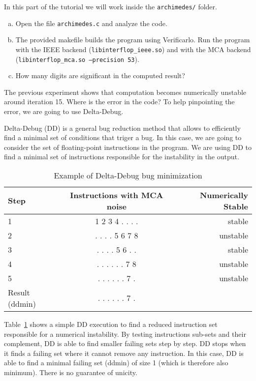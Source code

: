 In this part of the tutorial we will work inside the \texttt{archimedes/} folder.

\begin{question}
  \begin{enumerate}[(a)]
    \item Open the file \texttt{archimedes.c} and analyze the code.
    \item The provided makefile builds the program using Verificarlo. Run the program
      with the IEEE backend (\texttt{libinterflop\_ieee.so}) and with the MCA backend
      (\texttt{libinterflop\_mca.so --precision 53}).
    \item How many digits are significant in the computed result?
  \end{enumerate}
\end{question}

The previous experiment shows that computation becomes numerically unstable
around iteration 15. Where is the error in the code? To help pinpointing the error,
we are going to use Delta-Debug.

Delta-Debug (DD) is a general bug reduction method that allows to efficiently find a
minimal set of conditions that triger a bug. In this case, we are going to consider
the set of floating-point instructions in the program. We are using DD to
find a minimal set of instructions responsible for the instability in the output.

\begin{table}[h]
  \centering
  \begin{tabular}{lcr}
    Step & Instructions with MCA noise & Numerically Stable \\
    \midrule
    1    & 1 2 3 4 . . . . & stable \\
    2    & . . . . 5 6 7 8 & unstable \\
    \midrule
    3    & . . . . 5 6 . . & stable \\
    4    & . . . . . . 7 8 & unstable \\
    \midrule
    5    & . . . . . . 7 . & unstable \\
    Result (ddmin) & . . . . . . 7 . & \\
  \end{tabular}
  \caption{Example of Delta-Debug bug minimization\label{tab:deltadebug}}
\end{table}

Table~\ref{tab:deltadebug} shows a simple DD execution to find a reduced
instruction set responsible for a numerical instability. By testing
instructions sub-sets and their complement, DD is able to find smaller failing
sets step by step. DD stops when it finds a failing set where it cannot remove
any instruction. In this case, DD is able to find a minimal failing set (ddmin)
of size 1 (which is therefore also minimum). There is no guarantee of unicity.

